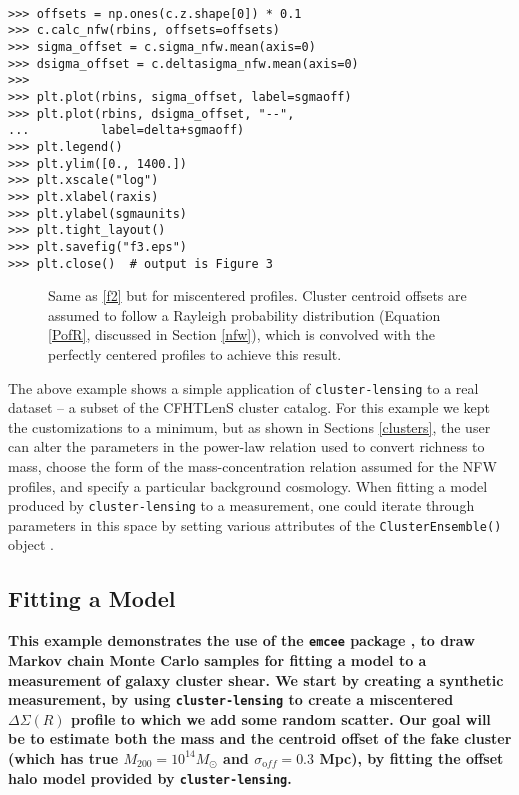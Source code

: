 \documentclass[twocolumn]{aastex6}
\newcommand{\code}{\lstinline[style=codeintext]}
\begin{document}
\begin{verbatim}

>>> offsets = np.ones(c.z.shape[0]) * 0.1
>>> c.calc_nfw(rbins, offsets=offsets)
>>> sigma_offset = c.sigma_nfw.mean(axis=0)
>>> dsigma_offset = c.deltasigma_nfw.mean(axis=0)
>>> 
>>> plt.plot(rbins, sigma_offset, label=sgmaoff)
>>> plt.plot(rbins, dsigma_offset, "--",
...          label=delta+sgmaoff)
>>> plt.legend()
>>> plt.ylim([0., 1400.])
>>> plt.xscale("log")
>>> plt.xlabel(raxis)
>>> plt.ylabel(sgmaunits)
>>> plt.tight_layout()
>>> plt.savefig("f3.eps")
>>> plt.close()  # output is Figure 3

\end{verbatim}
\begin{figure}
\caption{Same as \cref{f2} but for miscentered profiles. Cluster centroid offsets are assumed to follow a Rayleigh probability distribution (Equation \ref{PofR}, discussed in Section \ref{nfw}), which is convolved with the perfectly centered profiles to achieve this result.}
\label{f3}
\end{figure}

The above example shows a simple application of \code{cluster-lensing} to a real dataset -- a subset of the CFHTLenS cluster catalog.  For this example we kept the customizations to a minimum, but as shown in Sections \ref{clusters}, the user can alter the parameters in the power-law relation used to convert richness to mass, choose the form of the mass-concentration relation assumed for the NFW profiles, and specify a particular background cosmology. When fitting a model produced by \code{cluster-lensing} to a measurement, one could iterate through parameters in this space by setting various attributes of the \code{ClusterEnsemble()} object \citep[as done, e.g. in][]{Ford14, Ford15}.


\subsection{Fitting a Model}
\label{emcee_ex}
{\bf This example demonstrates the use of the \code{emcee} package \citep{emcee}, to draw Markov chain Monte Carlo samples for fitting a model to a measurement of galaxy cluster shear. We start by creating a synthetic measurement, by using \code{cluster-lensing} to create a miscentered $\Delta\Sigma(R)$ profile to which we add some random scatter. Our goal will be to estimate both the mass and the centroid offset of the fake cluster (which has true $M_{200} = 10^{14} M_{\odot}$ and $\sigma_{\mathrm off} = 0.3$ Mpc), by fitting the offset halo model provided by \code{cluster-lensing}.}
\end{document}
